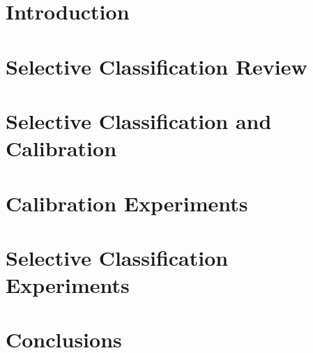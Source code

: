 \section{Introduction}



\section{Selective Classification Review}



\section{Selective Classification and Calibration}



\section{Calibration Experiments}



\section{Selective Classification Experiments}



\section{Conclusions}